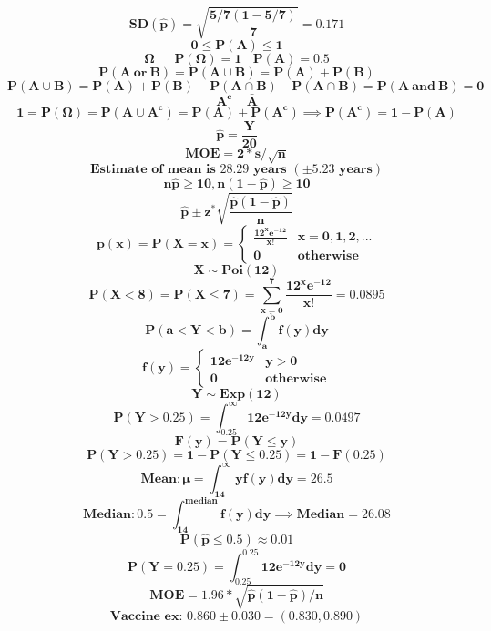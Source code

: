 \documentclass[12pt,portrait,semhelv,semrot]{article}
\begin{document}
{{$$\boldsymbol{SD(\hat{p}) = \sqrt{\frac{5/7(1-5/7)}{7}}=0.171}$$
$$\boldsymbol{0 \leq P(A) \leq 1}$$
$$\boldsymbol{\Omega~~~~~~~P(\Omega) = 1~~~~P(A) = 0.5}$$
$$\boldsymbol{P(A~or~B) = P(A\cup B) = P(A)+P(B)}$$
$$\boldsymbol{P(A\cup B) = P(A)+P(B)- P(A\cap B)~~~~~P(A\cap B) = P(A~and~B) = 0}$$
$$\boldsymbol{A^c~~~~~\bar{A}}$$
$$\boldsymbol{1 = P(\Omega) = P(A\cup A^c) = P(A)+P(A^c) \implies P(A^c) = 1-P(A)}$$
$$\boldsymbol{\hat{p} = \frac{Y}{20}}$$
$$\boldsymbol{MOE = 2*s/\sqrt{n}}$$
$$\boldsymbol{\mbox{Estimate of mean is } 28.29 \mbox{ years } (\pm 5.23 \mbox{ years})}$$
$$\boldsymbol{n\hat{p}\geq 10, n(1-\hat{p})\geq 10}$$  
$$\boldsymbol{\hat{p}\pm z^{*} \sqrt{\frac{\hat{p}(1-\hat{p})}{n}}}$$
$$\boldsymbol{p(x) = P(X=x) = \begin{cases} \frac{12^x e^{-12}}{x!} & x = 0, 1, 2, ... \\ 0 & \mbox{otherwise}\end{cases}}$$
$$\boldsymbol{X\sim Poi(12)}$$
$$\boldsymbol{P(X<8) = P(X\leq 7) = \sum_{x=0}^{7}\frac{12^x e^{-12}}{x!} = 0.0895}$$
$$\boldsymbol{P(a < Y < b) = \int_a^b f(y)dy}$$
$$\boldsymbol{f(y) = \begin{cases} 12e^{-12y} & y > 0 \\ 0 & \mbox{otherwise}\end{cases}}$$
$$\boldsymbol{Y\sim Exp(12)}$$
$$\boldsymbol{P(Y > 0.25) = \int_{0.25}^{\infty} 12e^{-12y}dy = 0.0497}$$
$$\boldsymbol{F(y) = P(Y\leq y)}$$
$$\boldsymbol{P(Y > 0.25) = 1-P(Y\leq 0.25) = 1 - F(0.25)}$$
$$\boldsymbol{Mean: \mu = \int_{14}^{\infty} y f(y)dy = 26.5}$$
$$\boldsymbol{Median:  0.5 = \int_{14}^{median} f(y)dy \implies Median = 26.08}$$
$$\boldsymbol{P(\hat{p}\leq 0.5)\approx 0.01}$$
$$\boldsymbol{P(Y = 0.25) = \int_{0.25}^{0.25} 12e^{-12y}dy = 0}$$
$$\boldsymbol{MOE = 1.96*\sqrt{\hat{p}(1-\hat{p})/n}}$$
$$\boldsymbol{\mbox{Vaccine ex: } 0.860 \pm 0.030 = (0.830, 0.890)}$$
}}
\end{document}
